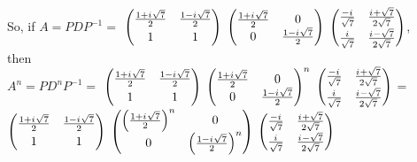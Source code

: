 \documentclass{article}
\newcommand{\iu}{{i\mkern1mu}}
\begin{document}
                    So, if $A = PDP^{-1} = $ 
                    	\(\begin{pmatrix}\frac{1 + \iu\sqrt{7}}{2} & \frac{1 - \iu\sqrt{7}}{2}\\[3pt] 1 & 1\end{pmatrix}\)
                    	\(\begin{pmatrix}\frac{1 + \iu\sqrt{7}}{2} & 0\\0 & \frac{1 - \iu\sqrt{7}}{2}\end{pmatrix}\)
                         \(\begin{pmatrix}\frac{-\iu}{\sqrt{7}} & \frac{\iu + \sqrt{7}}{2\sqrt{7}} \\[3pt] \frac{\iu}{\sqrt{7}} & \frac{\iu - \sqrt{7}}{2\sqrt{7}}\end{pmatrix}\), \\[10pt]
                    then \\[10pt]
                    $A^n = PD^nP^{-1} = $
                    \(\begin{pmatrix}\frac{1 + \iu\sqrt{7}}{2} & \frac{1 - \iu\sqrt{7}}{2}\\[3pt] 1 & 1\end{pmatrix}\)
                    	\(\begin{pmatrix}\frac{1 + \iu\sqrt{7}}{2} & 0\\0 & \frac{1 - \iu\sqrt{7}}{2}\end{pmatrix}^{n}\)
                         \(\begin{pmatrix}\frac{-\iu}{\sqrt{7}} & \frac{\iu + \sqrt{7}}{2\sqrt{7}} \\[3pt] \frac{\iu}{\sqrt{7}} & \frac{\iu - \sqrt{7}}{2\sqrt{7}}\end{pmatrix}\) = \(\begin{pmatrix}\frac{1 + \iu\sqrt{7}}{2} & \frac{1 - \iu\sqrt{7}}{2}\\[3pt] 1 & 1\end{pmatrix}\)
                    	\(\begin{pmatrix}\left(\frac{1 + \iu\sqrt{7}}{2}\right)^n & 0\\0 & \left(\frac{1 - \iu\sqrt{7}}{2}\right)^n\end{pmatrix}\)
                         \(\begin{pmatrix}\frac{-\iu}{\sqrt{7}} & \frac{\iu + \sqrt{7}}{2\sqrt{7}} \\[3pt] \frac{\iu}{\sqrt{7}} & \frac{\iu - \sqrt{7}}{2\sqrt{7}}\end{pmatrix}\) \\
\end{document}
